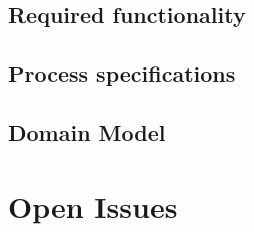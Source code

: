 \documentclass{article}
\begin{document}
\subsection{Required functionality}
\subsection{Process specifications}
\subsection{Domain Model}
\section{Open Issues}
\end{document}
